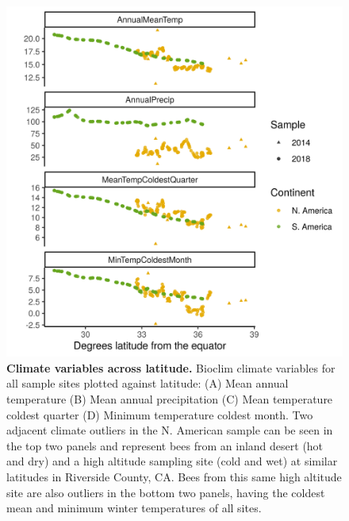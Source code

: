 \begin{figure}[ht] 
\includegraphics[width=.9\textwidth]{chapter1/figures/climate_variables_across_latitude.png}
\caption{ \textbf{Climate variables across latitude.} Bioclim climate variables for all sample sites plotted against latitude: (A) Mean annual temperature (B) Mean annual precipitation (C) Mean temperature coldest quarter (D) Minimum temperature coldest month. Two adjacent climate outliers in the N. American sample can be seen in the top two panels and represent bees from an inland desert (hot and dry) and a high altitude sampling site (cold and wet) at similar latitudes in Riverside County, CA. Bees from this same high altitude site are also outliers in the bottom two panels, having the coldest mean and minimum winter temperatures of all sites.}

\label{supp_bioclim}
\end{figure}

